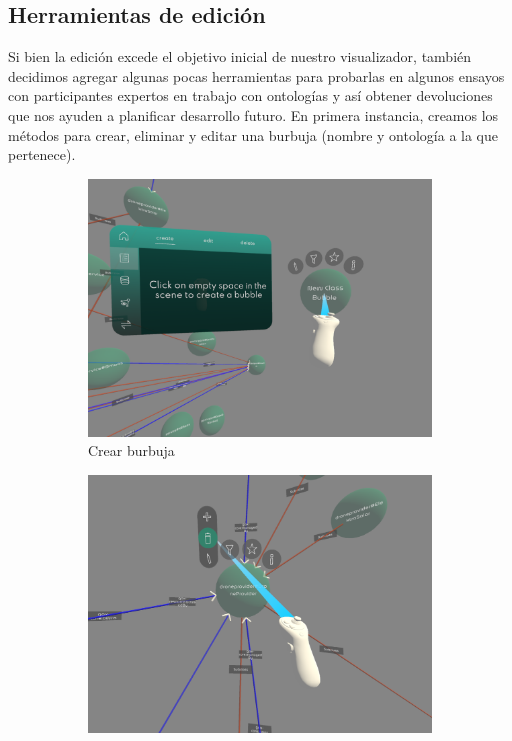\subsection{Herramientas de edición}

Si bien la edición excede el objetivo inicial de nuestro visualizador, también decidimos agregar algunas pocas herramientas para probarlas en algunos ensayos con participantes expertos en trabajo con ontologías y así obtener devoluciones que nos ayuden a planificar desarrollo futuro. En primera instancia, creamos los métodos para crear, eliminar y editar una burbuja (nombre y ontología a la que pertenece).

\begin{figure}[ht]
   \centering
   \begin{subfigure}{0.3\textwidth}
       \centering
       \includegraphics[width=\textwidth]{chapter2/figures/createbubble.png}
       \caption{Crear burbuja}
   \end{subfigure}
   \hfill
   \begin{subfigure}{0.3\textwidth}
       \centering
       \includegraphics[width=\textwidth]{chapter2/figures/deletebubble.png}

\end{subfigure}
\end{figure}
